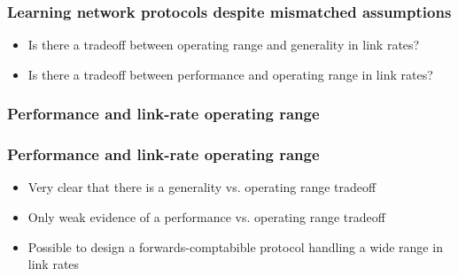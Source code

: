 \begin{frame}
\frametitle{Learning network protocols despite mismatched assumptions}
\begin{itemize}
\item<2-> Is there a tradeoff between operating range and generality in link rates?
\item<3-> Is there a tradeoff between performance and operating range in link rates?
\end{itemize}
\end{frame}


\begin{frame}
\frametitle{Performance and link-rate operating range}
\begin{centering}

\noindent {}

\end{centering}
\end{frame}

\begin{frame}
\frametitle{Performance and link-rate operating range}
\begin{itemize}
\item <2->{Very clear that there is a generality vs. operating range tradeoff}
\item <3->{Only weak evidence of a performance vs. operating range tradeoff}
\item <4->{Possible to design a forwards-comptabible protocol handling a wide range in link rates}
\end{itemize}
\end{frame}
